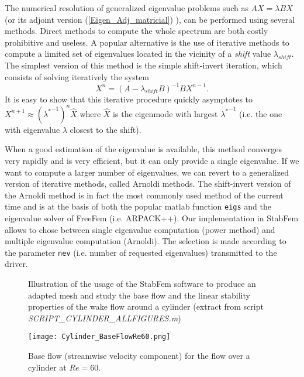 \documentclass[twocolumn,10pt]{asme2ej}
\begin{document}
The numerical resolution of generalized eigenvalue problems such as $A X = \lambda B X$ (or its adjoint version (\ref{Eigen_Adj_matricial}) ), 
can be performed using several methods. Direct methods to compute the whole spectrum are both costly prohibitive and useless. A popular alternative is the use of iterative methods to compute a limited set of eigenvalues located in the vicinity of a 
{\em shift} value $\lambda_{shift}$. The simplest version of this method is the simple shift-invert iteration, which consists of solving iteratively the system
$$
X^{n} =  (A- \lambda_{shift} B)^{-1} B X^{n-1}.
$$ 
It is easy to show that this iterative procedure quickly asymptotes to $X^{n+1} \approx ({\lambda^*}^{-1})^n \hat{X}$
where $\hat{X}$ is the eigenmode with largest ${\lambda^*}^{-1}$ (i.e. the one with eigenvalue $\lambda$ closest to the shift). 


When a good estimation of the eigenvalue is available, this method converges very rapidly and is very efficient, but it can only provide a single eigenvalue.
If we want to compute a larger number of eigenvalues, we can revert to a generalized version of iterative methods, called Arnoldi methods\cite{Arnoldi51}. The shift-invert version of the Arnoldi method is in fact the most commonly used method of the current time and is at the basis of both the popular matlab function {\tt{eigs}} and the eigenvalue solver of FreeFem (i.e. ARPACK++). Our implementation in StabFem allows to chose between single eigenvalue computation (power method) and multiple eigenvalue computation (Arnoldi). The selection is made according to the parameter \verb|nev|  (i.e. number of requested eigenvalues) transmitted to the driver.



\begin{figure*}[t]
\small

 \normalsize
\caption{Illustration of the usage of the StabFem software to produce an adapted mesh and study the base flow and the linear stability properties of the wake flow around a cylinder 
(extract from script {\em SCRIPT\_CYLINDER\_ALLFIGURES.m})}
\label{Listing2}
\end{figure*}


\begin{figure}
\texttt{[image: Cylinder\_BaseFlowRe60.png]}
\caption{Base flow (streamwise velocity component) for the flow over a cylinder at $Re=60$.}
\label{fig:Baseflow}
\end{figure}
\end{document}
